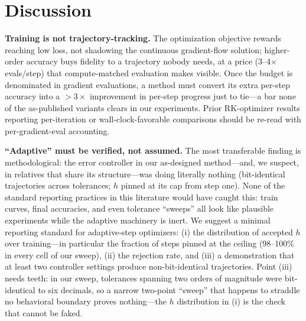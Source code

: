 \documentclass{article}
\begin{document}
\section{Discussion}
\label{sec:discussion}

\textbf{Training is not trajectory-tracking.} The optimization objective rewards reaching low loss, not shadowing the continuous gradient-flow solution; higher-order accuracy buys fidelity to a trajectory nobody needs, at a price (3--4$\times$ evals/step) that compute-matched evaluation makes visible. Once the budget is denominated in gradient evaluations, a method must convert its extra per-step accuracy into a $>3\times$ improvement in per-step progress just to tie---a bar none of the as-published variants clears in our experiments. Prior RK-optimizer results reporting per-iteration or wall-clock-favorable comparisons should be re-read with per-gradient-eval accounting.

\textbf{``Adaptive'' must be verified, not assumed.} The most transferable finding is methodological: the error controller in our as-designed method---and, we suspect, in relatives that share its structure---was doing literally nothing (bit-identical trajectories across tolerances; $h$ pinned at its cap from step one). None of the standard reporting practices in this literature would have caught this: train curves, final accuracies, and even tolerance ``sweeps'' all look like plausible experiments while the adaptive machinery is inert. We suggest a minimal reporting standard for adaptive-step optimizers: (i) the distribution of accepted $h$ over training---in particular the fraction of steps pinned at the ceiling (98--100\% in every cell of our sweep), (ii) the rejection rate, and (iii) a demonstration that at least two controller settings produce non-bit-identical trajectories. Point (iii) needs teeth: in our sweep, tolerances spanning two orders of magnitude were bit-identical to six decimals, so a narrow two-point ``sweep'' that happens to straddle no behavioral boundary proves nothing---the $h$ distribution in (i) is the check that cannot be faked.
\end{document}
